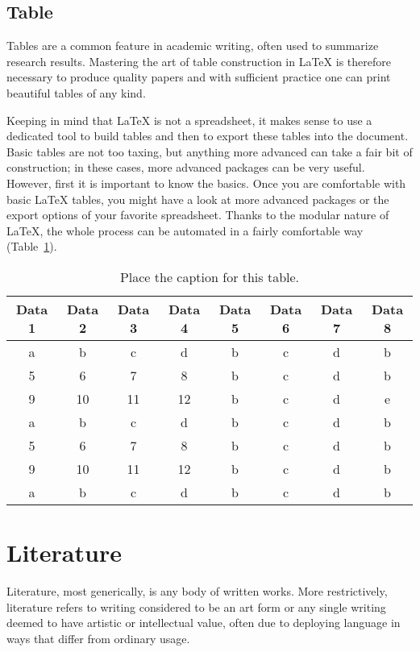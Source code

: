 \documentclass[11pt, a4paper]{article}
\begin{document}
\subsection{Table}
Tables are a common feature in academic writing, often used to summarize research results. Mastering the art of table construction in LaTeX is therefore necessary to produce quality papers and with sufficient practice one can print beautiful tables of any kind.

Keeping in mind that LaTeX is not a spreadsheet, it makes sense to use a dedicated tool to build tables and then to export these tables into the document. Basic tables are not too taxing, but anything more advanced can take a fair bit of construction; in these cases, more advanced packages can be very useful. However, first it is important to know the basics. Once you are comfortable with basic LaTeX tables, you might have a look at more advanced packages or the export options of your favorite spreadsheet. Thanks to the modular nature of LaTeX, the whole process can be automated in a fairly comfortable way (Table~\ref{tab:sample2}).

\begin{table}
	\centering
	\caption{Place the caption for this table.}
	\label{tab:sample2}
	\renewcommand{\arraystretch}{1.5}
	\begin{tabular*}{\linewidth}{c @{\extracolsep{\fill}} ccccccc}
		\hline 
		Data 1 & Data 2 & Data 3 & Data 4 & Data 5 & Data 6 & Data 7 & Data 8\\ \hline
		a & b & c & d & b & c & d & b \\ 
		5 & 6 & 7 & 8 & b & c & d & b \\ 
		9 & 10 & 11 & 12 & b  & c & d & e \\ 
		a & b & c & d & b & c & d & b \\ 
		5 & 6 & 7 & 8 & b & c & d & b \\ 
		9 & 10 & 11 & 12 & b & c  & d & b \\ 
		a & b & c & d & b & c & d & b \\ \hline 
	\end{tabular*} 
\end{table}

\section{Literature}\label{sec:lit}
Literature, most generically, is any body of written works. More restrictively, literature refers to writing considered to be an art form or any single writing deemed to have artistic or intellectual value, often due to deploying language in ways that differ from ordinary usage.
\end{document}
